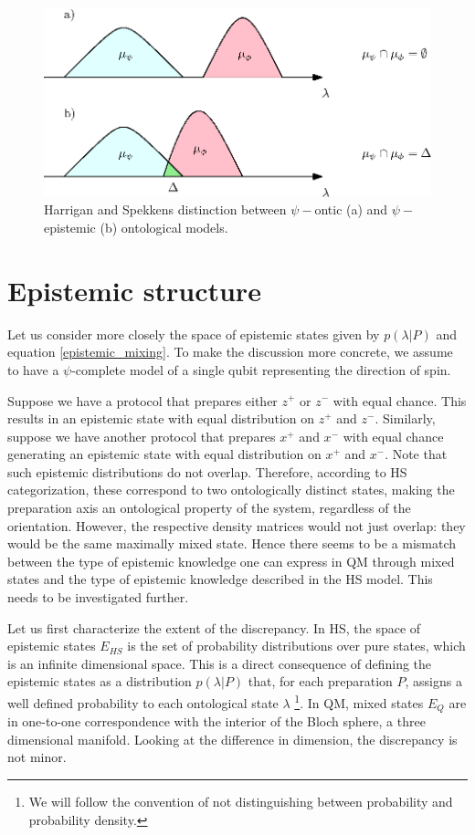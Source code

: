 \documentclass[twocolumn,prl,floatfix,superscriptaddress]{revtex4-2}
\begin{document}
\begin{figure}
\includegraphics[scale=.7]{ontic}
\caption{\footnotesize{Harrigan and Spekkens distinction between $\psi-$ontic (a) and $\psi-$epistemic (b) ontological models.}}\label{overlap}
\end{figure}

\section{Epistemic structure}

Let us consider more closely the space of epistemic states given by $p(\lambda | P)$ and equation \ref{epistemic_mixing}. To make the discussion more concrete, we assume to have a $\psi$-complete model of a single qubit representing the direction of spin.

Suppose we have a protocol that prepares either $z^+$ or $z^-$ with equal chance. This results in an epistemic state with equal distribution on $z^+$ and $z^-$. Similarly, suppose we have another protocol that prepares $x^+$ and $x^-$ with equal chance generating an epistemic state with equal distribution on $x^+$ and $x^-$. Note that such epistemic distributions do not overlap. Therefore, according to HS categorization, these correspond to two ontologically distinct states, making the preparation axis an ontological property of the system, regardless of the orientation. However, the respective density matrices would not just overlap: they would be the same maximally mixed state. Hence there seems to be a mismatch between the type of epistemic knowledge one can express in QM through mixed states and the type of epistemic knowledge described in the HS model. This needs to be investigated further.

Let us first characterize the extent of the discrepancy. In HS, the space of epistemic states $E_{HS}$ is the set of probability distributions over pure states, which is an infinite dimensional space. This is a direct consequence of defining the epistemic states as a distribution $p(\lambda|P)$ that, for each preparation $P$, assigns a well defined probability to each ontological state $\lambda$ \footnote{We will follow the convention of not distinguishing between probability and probability density.}. In QM, mixed states $E_{Q}$ are in one-to-one correspondence with the interior of the Bloch sphere, a three dimensional manifold. Looking at the difference in dimension, the discrepancy is not minor.
\end{document}
